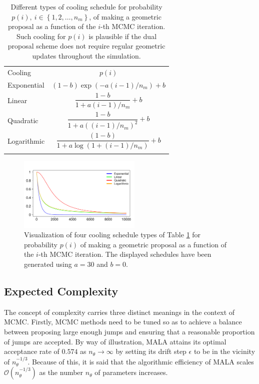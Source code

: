\documentclass[twoside,11pt]{article}
\begin{document}
{\begin{table}[t]
\centering
\begin{tabular}{l|c}
\hline\noalign{\smallskip}
Cooling & $p(i)$\\
\noalign{\smallskip}\hline\noalign{\smallskip}
Exponential & $(1-b)\exp(-a(i-1)/n_m)+b$\\
\noalign{\smallskip}\hline\noalign{\smallskip}
Linear & $\dfrac{1-b}{1+a(i-1)/n_m}+b$\\
\noalign{\smallskip}\hline\noalign{\smallskip}
Quadratic & $\dfrac{1-b}{1+a((i-1)/n_m)^2}+b$\\
\noalign{\smallskip}\hline\noalign{\smallskip}
Logarithmic & $\dfrac{(1-b)}{1+a\log(1+(i-1)/n_m)}+b$\\
\noalign{\smallskip}\hline
\end{tabular}
\caption{
Different types of cooling schedule for probability $p(i),~i\in\left\{1,2,\dots,n_m\right\}$, of making a geometric proposal 
as a function of the $i$-th MCMC iteration. Such cooling for $p(i)$ is plausible if the dual proposal scheme does not 
require regular geometric updates throughout the simulation.
}
\label{tab:cooling_schedules}
\end{table}

\begin{figure}[t]
\centering
\includegraphics[width=2.3in]{cooling_schedules.pdf}
\caption{
Visualization of four cooling schedule types of Table \ref{tab:cooling_schedules} for probability $p(i)$ of making a 
geometric proposal as a function of the $i$-th MCMC iteration. The displayed schedules have been generated using $a=30$ and 
$b=0$.
}
\label{fig:cooling_schedules}
\end{figure}

\subsection{Expected Complexity}
\label{Expected Complexity}

The concept of complexity carries three distinct meanings in the context of MCMC. Firstly, MCMC methods need to be tuned so
as to achieve a balance between proposing large enough jumps and ensuring that a reasonable proportion of jumps are accepted.
By way of illustration, MALA attains its optimal acceptance rate of $0.574$ as $n_{\theta}\rightarrow\infty$ by setting its
drift step $\epsilon$ to be in the vicinity of $n_{\theta}^{-1/3}$. Because of this, it is said that the algorithmic
efficiency of MALA scales $\mathcal{O}(n_{\theta}^{-1/3})$ as the number $n_{\theta}$ of parameters increases.

}
\end{document}
